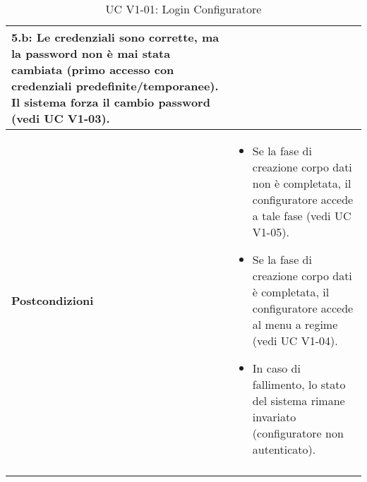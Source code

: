 \documentclass[a4paper,12pt]{article}
\begin{document}
\begin{longtable}{@{} p{} p{} @{}}
    \textbf{5.b}: Le credenziali sono corrette, ma la password non è mai stata cambiata (primo accesso con credenziali predefinite/temporanee). Il sistema forza il cambio password (vedi UC V1-03). \\
\midrule
\textbf{Postcondizioni} &
\begin{itemize}[leftmargin=*]
    \item Se la fase di creazione corpo dati non è completata, il configuratore accede a tale fase (vedi UC V1-05).
    \item Se la fase di creazione corpo dati è completata, il configuratore accede al menu a regime (vedi UC V1-04).
    \item In caso di fallimento, lo stato del sistema rimane invariato (configuratore non autenticato).
\end{itemize} \\
\bottomrule
\caption{UC V1-01: Login Configuratore} \label{uc:v1-01}
\end{longtable}
\end{document}

